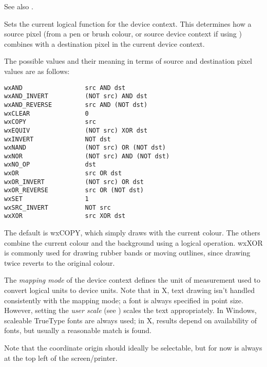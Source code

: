 See also .

\label{wxdcsetlogicalfunction}


Sets the current logical function for the device context.  This determines how
a source pixel (from a pen or brush colour, or source device context if
using ) combines with a destination pixel in the
current device context.

The possible values
and their meaning in terms of source and destination pixel values are
as follows:

\begin{verbatim}
wxAND                 src AND dst
wxAND_INVERT          (NOT src) AND dst
wxAND_REVERSE         src AND (NOT dst)
wxCLEAR               0
wxCOPY                src
wxEQUIV               (NOT src) XOR dst
wxINVERT              NOT dst
wxNAND                (NOT src) OR (NOT dst)
wxNOR                 (NOT src) AND (NOT dst)
wxNO_OP               dst
wxOR                  src OR dst
wxOR_INVERT           (NOT src) OR dst
wxOR_REVERSE          src OR (NOT dst)
wxSET                 1
wxSRC_INVERT          NOT src
wxXOR                 src XOR dst
\end{verbatim}

The default is wxCOPY, which simply draws with the current colour.
The others combine the current colour and the background using a
logical operation.  wxXOR is commonly used for drawing rubber bands or
moving outlines, since drawing twice reverts to the original colour.

\label{wxdcsetmapmode}


The {\it mapping mode} of the device context defines the unit of
measurement used to convert logical units to device units. Note that
in X, text drawing isn't handled consistently with the mapping mode; a
font is always specified in point size. However, setting the {\it
user scale} (see ) scales the text appropriately. In
Windows, scaleable TrueType fonts are always used; in X, results depend
on availability of fonts, but usually a reasonable match is found.

Note that the coordinate origin should ideally be selectable, but for
now is always at the top left of the screen/printer.

